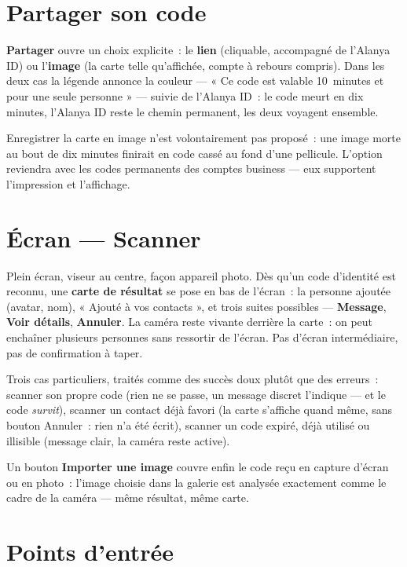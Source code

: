 \section{Partager son code}

\textbf{Partager} ouvre un choix explicite~: le \textbf{lien} (cliquable, accompagné de
l'Alanya ID) ou l'\textbf{image} (la carte telle qu'affichée, compte à rebours compris).
Dans les deux cas la légende annonce la couleur --- « Ce code est valable 10~minutes et
pour une seule personne » --- suivie de l'Alanya ID~: le code meurt en dix minutes,
l'Alanya ID reste le chemin permanent, les deux voyagent ensemble.

\begin{note}
Enregistrer la carte en image n'est volontairement pas proposé~: une image morte au bout
de dix minutes finirait en code cassé au fond d'une pellicule. L'option reviendra avec
les codes permanents des comptes business --- eux supportent l'impression et
l'affichage.
\end{note}

\section{Écran --- Scanner}

Plein écran, viseur au centre, façon appareil photo. Dès qu'un code d'identité est
reconnu, une \textbf{carte de résultat} se pose en bas de l'écran~: la personne ajoutée
(avatar, nom), « Ajouté à vos contacts », et trois suites possibles ---
\textbf{Message}, \textbf{Voir détails}, \textbf{Annuler}. La caméra reste vivante
derrière la carte~: on peut enchaîner plusieurs personnes sans ressortir de l'écran. Pas
d'écran intermédiaire, pas de confirmation à taper.

Trois cas particuliers, traités comme des succès doux plutôt que des erreurs~: scanner
son propre code (rien ne se passe, un message discret l'indique --- et le code
\emph{survit}), scanner un contact déjà favori (la carte s'affiche quand même, sans
bouton Annuler~: rien n'a été écrit), scanner un code expiré, déjà utilisé ou illisible
(message clair, la caméra reste active).

Un bouton \textbf{Importer une image} couvre enfin le code reçu en capture d'écran ou en
photo~: l'image choisie dans la galerie est analysée exactement comme le cadre de la
caméra --- même résultat, même carte.

\section{Points d'entrée}

